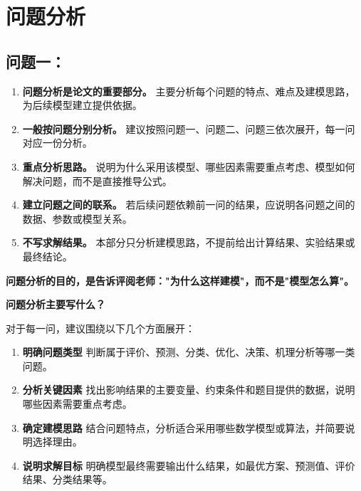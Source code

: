 \section{问题分析}
\subsection*{问题一：}
\begin{enumerate}[label=(\arabic*), leftmargin=2.5em, itemsep=0.3em]
\item \textbf{问题分析是论文的重要部分。} 主要分析每个问题的特点、难点及建模思路，为后续模型建立提供依据。

\item \textbf{一般按问题分别分析。} 建议按照问题一、问题二、问题三依次展开，每一问对应一份分析。

\item \textbf{重点分析思路。} 说明为什么采用该模型、哪些因素需要重点考虑、模型如何解决问题，而不是直接推导公式。

\item \textbf{建立问题之间的联系。} 若后续问题依赖前一问的结果，应说明各问题之间的数据、参数或模型关系。

\item \textbf{不写求解结果。} 本部分只分析建模思路，不提前给出计算结果、实验结果或最终结论。
\end{enumerate}

\textbf{问题分析的目的，是告诉评阅老师："为什么这样建模"，而不是"模型怎么算"。}

\textbf{问题分析主要写什么？}

对于每一问，建议围绕以下几个方面展开：
\begin{enumerate}[label=(\arabic*), leftmargin=2.5em, itemsep=0.3em]
\item \textbf{明确问题类型} 判断属于评价、预测、分类、优化、决策、机理分析等哪一类问题。

\item \textbf{分析关键因素} 找出影响结果的主要变量、约束条件和题目提供的数据，说明哪些因素需要重点考虑。

\item \textbf{确定建模思路} 结合问题特点，分析适合采用哪些数学模型或算法，并简要说明选择理由。

\item \textbf{说明求解目标} 明确模型最终需要输出什么结果，如最优方案、预测值、评价结果、分类结果等。
\end{enumerate}

